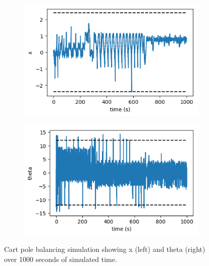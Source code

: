 \documentclass{article}
\begin{document}
\begin{figure}[h]
	\centering
	\begin{subfigure}[t]{0.30\linewidth}
		\centering
		\includegraphics[width = 1.0\linewidth, trim={5 5 5 10}, clip=true]{figures/learn50000_xs.png}
	\end{subfigure}%
	\hspace{0.1\linewidth}
	\begin{subfigure}[t]{0.30\linewidth}
		\centering
		\includegraphics[width = 1.0\linewidth, trim={5 5 5 5}, clip=true]{figures/learn50000_thetas.png}
	\end{subfigure}%
\caption{Cart pole balancing simulation showing x (left) and theta (right) over 1000 seconds of simulated time.}
\label{fig:balance_example}
\end{figure}
\end{document}
